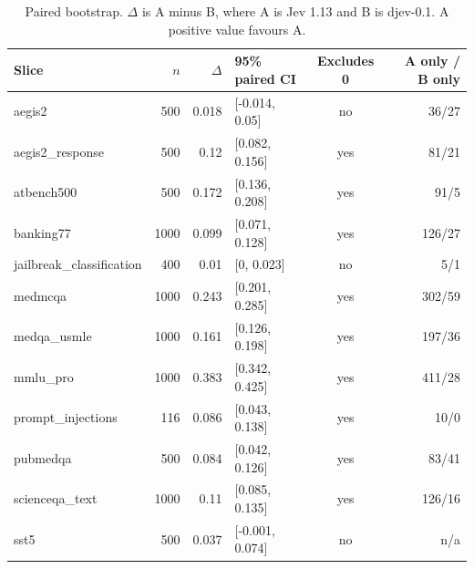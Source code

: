 \begin{table}[t]
\centering
\caption{Paired bootstrap. $\Delta$ is A minus B, where A is Jev 1.13 and B is djev-0.1. A positive value favours A.}
\small
\begin{tabular}{lrrlcr}
\toprule
Slice & $n$ & $\Delta$ & 95\% paired CI & Excludes 0 & A only / B only \\
\midrule
  aegis2 & 500 & 0.018 & [-0.014, 0.05] & no & 36/27 \\
  aegis2\_response & 500 & 0.12 & [0.082, 0.156] & yes & 81/21 \\
  atbench500 & 500 & 0.172 & [0.136, 0.208] & yes & 91/5 \\
  banking77 & 1000 & 0.099 & [0.071, 0.128] & yes & 126/27 \\
  jailbreak\_classification & 400 & 0.01 & [0, 0.023] & no & 5/1 \\
  medmcqa & 1000 & 0.243 & [0.201, 0.285] & yes & 302/59 \\
  medqa\_usmle & 1000 & 0.161 & [0.126, 0.198] & yes & 197/36 \\
  mmlu\_pro & 1000 & 0.383 & [0.342, 0.425] & yes & 411/28 \\
  prompt\_injections & 116 & 0.086 & [0.043, 0.138] & yes & 10/0 \\
  pubmedqa & 500 & 0.084 & [0.042, 0.126] & yes & 83/41 \\
  scienceqa\_text & 1000 & 0.11 & [0.085, 0.135] & yes & 126/16 \\
  sst5 & 500 & 0.037 & [-0.001, 0.074] & no & n/a \\
\bottomrule
\end{tabular}
\end{table}

